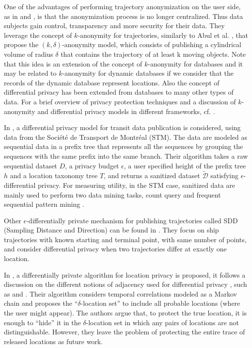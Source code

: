 \documentclass[review]{elsarticle}
\begin{document}
One of the advantages of performing trajectory anonymization on the user side, as in \cite{Romero-Tris2016} and \cite{Romero-Tris:2018}, is that the anonymization process is no longer centralized. Thus data subjects gain control, transparency and more security for their data.
They leverage the concept of $k$-anonymity for trajectories, similarly to Abul et al. \cite{Abul2008}, that propose the $(k, \delta)$-anonymity model, which consists of publishing a cylindrical volume of radius $\delta$ that contains the trajectory of at least k moving objects. 
Note that this idea is an extension of the concept of $k$-anonymity for databases \cite{Samarati:1998} and it may be related to $k$-anonymity for dynamic databases \cite{Salas:2018-b} if we consider that the records of the dynamic database represent locations.  
Also the concept of differential privacy \cite{Dwork:2006} has been extended from databases to many other types of data.
For a brief overview of privacy protection techniques and a discussion of $k$-anonymity and differential privacy models in different frameworks, cf. \cite{Salas:2018}.


In \cite{Chen:2012}, a differential privacy model for transit data publication is considered, using data from the Soci\'{e}t\'{e} de Transport de Montr\'{e}al (STM). The data are modeled as sequential data in a prefix tree that represents all the sequences by grouping the sequences with the same prefix into the same branch.
Their algorithm takes a raw sequential dataset $D$, a privacy budget $\epsilon$, a user specified height of the prefix tree $h$ and a location taxonomy tree $T$, and returns a sanitized dataset $\tilde{\mathcal{D}}$ satisfying $\epsilon$-differential privacy.
For measuring utility, in the STM case, sanitized data are mainly used to perform two
data mining tasks, count query and frequent sequential pattern mining \cite{Agrawal:1995}.


Other $\epsilon$-differentially private mechanism for publishing trajectories called SDD (Sampling Distance and Direction) can be found in \cite{Jiang:2013}.
They focus on ship trajectories with known starting and terminal point, with same number of points, and consider differential privacy when two trajectories differ at exactly one location.


In \cite{Xiao:2015}, a differentially private algorithm for location privacy is proposed, it follows a discussion on the different notions of adjacency used for  differential privacy , such as \cite{Chatzik:2013} and  \cite{Kifer:2011}.
Their algorithm considers temporal correlations modeled as a Markov chain and proposes the ``$\delta$-location set'' to include all probable locations (where the user might appear). The authors argue that, to protect the true location, it is enough to “hide” it in the $\delta$-location set in which any pairs of locations are not distinguishable.
However, they leave the problem of protecting the entire trace of released locations as future work.
\end{document}
